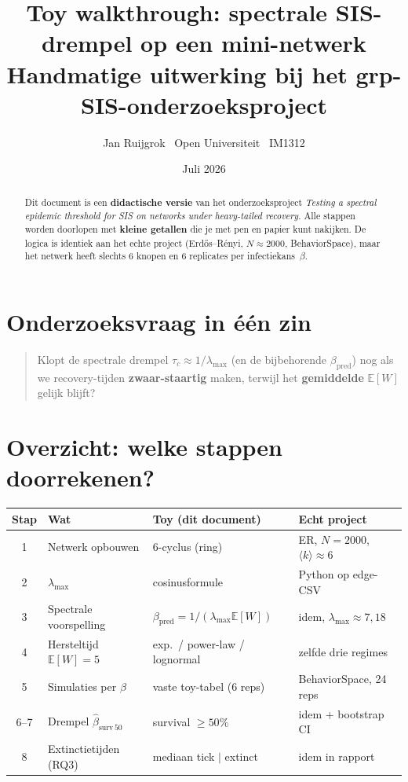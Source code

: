 \documentclass[11pt,a4paper]{article}
\title{Toy walkthrough: spectrale SIS-drempel op een mini-netwerk\\[0.4em]
\large Handmatige uitwerking bij het grp-SIS-onderzoeksproject}
\author{Jan Ruijgrok \textbar\ Open Universiteit \textbar\ IM1312}
\date{Juli 2026}
\begin{document}
\maketitle

\begin{abstract}
Dit document is een \textbf{didactische versie} van het onderzoeksproject \emph{Testing a spectral epidemic threshold for SIS on networks under heavy-tailed recovery}. Alle stappen worden doorlopen met \textbf{kleine getallen} die je met pen en papier kunt nakijken. De logica is identiek aan het echte project (Erd\H{o}s--R\'enyi, $N{\approx}2000$, BehaviorSpace), maar het netwerk heeft slechts 6 knopen en 6 replicates per infectiekans~$\beta$.
\end{abstract}

\section*{Onderzoeksvraag in \'e\'en zin}
\begin{quote}
Klopt de spectrale drempel $\tau_c \approx 1/\lambda_{\max}$ (en de bijbehorende $\beta_{\mathrm{pred}}$) nog als we recovery-tijden \textbf{zwaar-staartig} maken, terwijl het \textbf{gemiddelde} $\mathbb{E}[W]$ gelijk blijft?
\end{quote}

\section{Overzicht: welke stappen doorrekenen?}

\begin{center}
\small
\begin{tabular}{@{}clll@{}}
\toprule
\textbf{Stap} & \textbf{Wat} & \textbf{Toy (dit document)} & \textbf{Echt project} \\
\midrule
1 & Netwerk opbouwen & 6-cyclus (ring) & ER, $N{=}2000$, $\langle k\rangle{\approx}6$ \\
2 & $\lambda_{\max}$ & cosinusformule & Python op edge-CSV \\
3 & Spectrale voorspelling & $\beta_{\mathrm{pred}}=1/(\lambda_{\max}\mathbb{E}[W])$ & idem, $\lambda_{\max}{\approx}7{,}18$ \\
4 & Hersteltijd $\mathbb{E}[W]{=}5$ & exp.\ / power-law / lognormal & zelfde drie regimes \\
5 & Simulaties per $\beta$ & vaste toy-tabel (6 reps) & BehaviorSpace, 24 reps \\
6--7 & Drempel $\hat\beta_{\mathrm{surv}\,50}$ & survival $\ge 50\%$ & idem + bootstrap CI \\
8 & Extinctietijden (RQ3) & mediaan tick $|$ extinct & idem in rapport \\
\bottomrule
\end{tabular}
\end{center}
\end{document}
